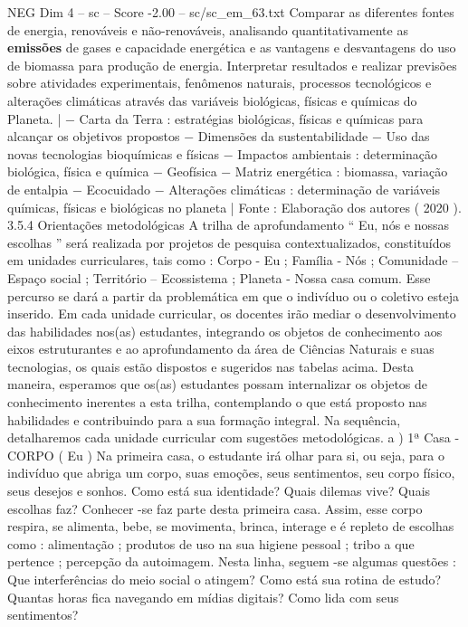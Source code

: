 \begin{textsample}{NEG Dim 4 – sc – Score -2.00 – sc/sc\_em\_63.txt}
Comparar as diferentes fontes de energia, renováveis e não-renováveis, analisando quantitativamente as \textbf{emissões} de gases e capacidade energética e as vantagens e desvantagens do uso de biomassa para produção de energia.
Interpretar resultados e realizar previsões sobre atividades experimentais, fenômenos naturais, processos tecnológicos e alterações climáticas através das variáveis biológicas, físicas e químicas do Planeta. | − Carta da Terra : estratégias biológicas, físicas e químicas para alcançar os objetivos propostos − Dimensões da sustentabilidade − Uso das novas tecnologias bioquímicas e físicas − Impactos ambientais : determinação biológica, física e química − Geofísica − Matriz energética : biomassa, variação de entalpia − Ecocuidado − Alterações climáticas : determinação de variáveis químicas, físicas e biológicas no planeta | Fonte : Elaboração dos autores ( 2020 ). 3.5.4 Orientações metodológicas A trilha de aprofundamento “ Eu, nós e nossas escolhas ” será realizada por projetos de pesquisa contextualizados, constituídos em unidades curriculares, tais como : Corpo - Eu ; Família - Nós ; Comunidade – Espaço social ; Território – Ecossistema ; Planeta - Nossa casa comum.
Esse percurso se dará a partir da problemática em que o indivíduo ou o coletivo esteja inserido.
Em cada unidade curricular, os docentes irão mediar o desenvolvimento das habilidades nos(as) estudantes, integrando os objetos de conhecimento aos eixos estruturantes e ao aprofundamento da área de Ciências Naturais e suas tecnologias, os quais estão dispostos e sugeridos nas tabelas acima.
Desta maneira, esperamos que os(as) estudantes possam internalizar os objetos de conhecimento inerentes a esta trilha, contemplando o que está proposto nas habilidades e contribuindo para a sua formação integral.
Na sequência, detalharemos cada unidade curricular com sugestões metodológicas. a ) 1ª Casa - CORPO ( Eu ) Na primeira casa, o estudante irá olhar para si, ou seja, para o indivíduo que abriga um corpo, suas emoções, seus sentimentos, seu corpo físico, seus desejos e sonhos.
Como está sua identidade?
Quais dilemas vive?
Quais escolhas faz?
Conhecer -se faz parte desta primeira casa.
Assim, esse corpo respira, se alimenta, bebe, se movimenta, brinca, interage e é repleto de escolhas como : alimentação ; produtos de uso na sua higiene pessoal ; tribo a que pertence ; percepção da autoimagem.
Nesta linha, seguem -se algumas questões : Que interferências do meio social o atingem?
Como está sua rotina de estudo?
Quantas horas fica navegando em mídias digitais?
Como lida com seus sentimentos?

\end{textsample}
